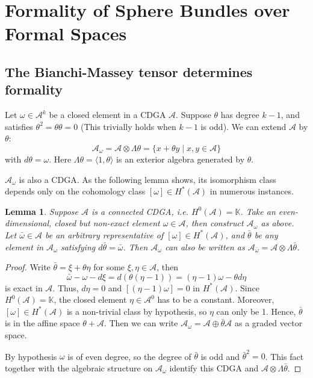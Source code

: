 \documentclass{article}
\theoremstyle{plain}
\newtheorem{lem}[thm]{Lemma}
\theoremstyle{definition}
\theoremstyle{plain}
\numberwithin{equation}{section}
\begin{document}
\section{Formality of Sphere Bundles over Formal Spaces}

\subsection{The Bianchi-Massey tensor determines formality}
Let $\omega\in \mathcal{A}^{k}$ be a closed element in a CDGA $\mathcal{A}$. Suppose $\theta$ has degree $k-1$, and satisfies $\theta^2=\theta\theta=0$ (This trivially holds when $k-1$ is odd). We can extend $\mathcal{A}$ by $\theta$:
$$
\mathcal{A}_{\omega}=\mathcal{A}\otimes \Lambda\theta=\{ x+\theta y \mid x,y\in \mathcal{A} \}
$$
with $d\theta=\omega$. Here $\Lambda\theta=\langle 1,\theta \rangle$ is an exterior algebra generated by $\theta$.

$\mathcal{A}_{\omega}$ is also a CDGA. As the following lemma shows, its isomorphism class depends only on the cohomology class $[\omega]\in H^*(\mathcal{A})$ in numerous instances.

\begin{lem}\label{choosing representatives of extension}
Suppose $\mathcal{A}$ is a connected CDGA, i.e. $H^0(\mathcal{A})=\mathbb{K}$. Take an even-dimensional, closed but non-exact element $\omega\in\mathcal{A}$, then construct $\mathcal{A}_{\omega}$ as above. Let $\bar{\omega}\in\mathcal{A}$ be an arbitrary representative of $[\omega]\in H^*(\mathcal{A})$, and $\bar{\theta}$ be any element in $\mathcal{A}_{\omega}$ satisfying $d\bar{\theta}=\bar{\omega}$. Then $\mathcal{A}_{\omega}$ can also be written as $\mathcal{A}_{\bar{\omega}}=\mathcal{A}\otimes \Lambda\bar{\theta}$.
\end{lem}
\begin{proof}
Write $\bar{\theta}=\xi+\theta\eta$ for some $\xi,\eta\in\mathcal{A}$, then
$$
\bar{\omega}-\omega-d\xi=d(\theta(\eta-1))=(\eta-1)\omega-\theta d\eta
$$
is exact in $\mathcal{A}$. Thus, $d\eta=0$ and $[(\eta-1)\omega]=0$ in $H^*(\mathcal{A})$. Since $H^0(\mathcal{A})=\mathbb{K}$, the closed element $\eta\in\mathcal{A}^0$ has to be a constant. Moreover, $[\omega]\in H^*(\mathcal{A})$ is a non-trivial class by hypothesis, so $\eta$ can only be 1. Hence, $\bar{\theta}$ is in the affine space $\theta+\mathcal{A}$. Then we can write $\mathcal{A}_{\omega}=\mathcal{A}\oplus\bar{\theta}\mathcal{A}$ as a graded vector space.

By hypothesis $\omega$ is of even degree, so the degree of $\bar{\theta}$ is odd and $\bar{\theta}^2=0$. This fact together with the algebraic structure on $\mathcal{A}_{\omega}$ identify this CDGA and $\mathcal{A}\otimes \Lambda\bar{\theta}$.
\end{proof}
\end{document}
